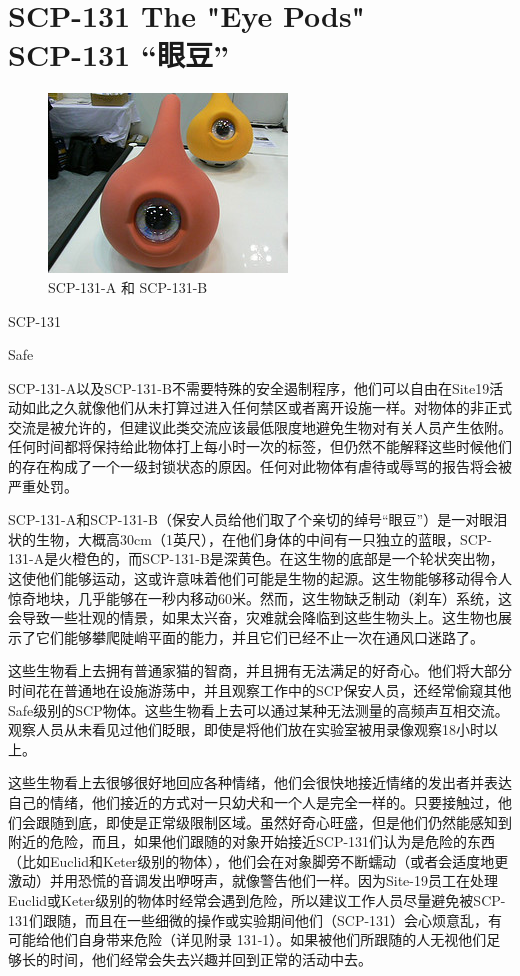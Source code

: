 \chapter[SCP-131 “眼豆”]{
    SCP-131 The "Eye Pods"\\
    SCP-131 “眼豆”
}

\label{chap:SCP-131}

\begin{figure}[H]
    \centering
    \includegraphics[width=0.5\linewidth]{images/SCP-131.jpg}
    \caption*{SCP-131-A 和 SCP-131-B}
\end{figure}

SCP-131

Safe

SCP-131-A以及SCP-131-B不需要特殊的安全遏制程序，他们可以自由在Site19活动如此之久就像他们从未打算过进入任何禁区或者离开设施一样。对物体的非正式交流是被允许的，但建议此类交流应该最低限度地避免生物对有关人员产生依附。任何时间都将保持给此物体打上每小时一次的标签，但仍然不能解释这些时候他们的存在构成了一个一级封锁状态的原因。任何对此物体有虐待或辱骂的报告将会被严重处罚。

SCP-131-A和SCP-131-B（保安人员给他们取了个亲切的绰号“眼豆”）是一对眼泪状的生物，大概高30cm（1英尺），在他们身体的中间有一只独立的蓝眼，SCP-131-A是火橙色的，而SCP-131-B是深黄色。在这生物的底部是一个轮状突出物，这使他们能够运动，这或许意味着他们可能是生物的起源。这生物能够移动得令人惊奇地块，几乎能够在一秒内移动60米。然而，这生物缺乏制动（刹车）系统，这会导致一些壮观的情景，如果太兴奋，灾难就会降临到这些生物头上。这生物也展示了它们能够攀爬陡峭平面的能力，并且它们已经不止一次在通风口迷路了。

这些生物看上去拥有普通家猫的智商，并且拥有无法满足的好奇心。他们将大部分时间花在普通地在设施游荡中，并且观察工作中的SCP保安人员，还经常偷窥其他Safe级别的SCP物体。这些生物看上去可以通过某种无法测量的高频声互相交流。观察人员从未看见过他们眨眼，即使是将他们放在实验室被用录像观察18小时以上。

这些生物看上去很够很好地回应各种情绪，他们会很快地接近情绪的发出者并表达自己的情绪，他们接近的方式对一只幼犬和一个人是完全一样的。只要接触过，他们会跟随到底，即使是正常级限制区域。虽然好奇心旺盛，但是他们仍然能感知到附近的危险，而且，如果他们跟随的对象开始接近SCP-131们认为是危险的东西（比如Euclid和Keter级别的物体），他们会在对象脚旁不断蠕动（或者会适度地更激动）并用恐慌的音调发出咿呀声，就像警告他们一样。因为Site-19员工在处理Euclid或Keter级别的物体时经常会遇到危险，所以建议工作人员尽量避免被SCP-131们跟随，而且在一些细微的操作或实验期间他们（SCP-131）会心烦意乱，有可能给他们自身带来危险（详见附录 131-1）。如果被他们所跟随的人无视他们足够长的时间，他们经常会失去兴趣并回到正常的活动中去。


